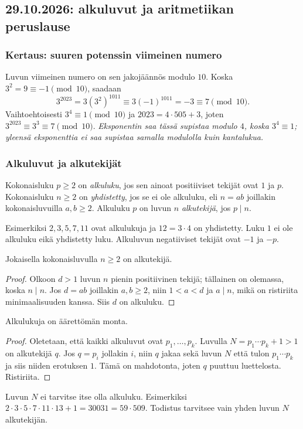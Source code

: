 \documentclass[11pt,a4paper]{amsart}
\begin{document}
\newpage
\subsection{29.10.2026: alkuluvut ja aritmetiikan peruslause}

\subsubsection{Kertaus: suuren potenssin viimeinen numero}
Luvun viimeinen numero on sen jakojäännös modulo $10$.
Koska $3^2=9\equiv-1\pmod{10}$, saadaan
\[
  3^{2023}=3(3^2)^{1011}
  \equiv3(-1)^{1011}=-3\equiv7\pmod{10}.
\]
Vaihtoehtoisesti $3^4\equiv1\pmod{10}$ ja $2023=4\cdot505+3$, joten
$3^{2023}\equiv3^3\equiv7\pmod{10}$.
\emph{Eksponentin saa tässä supistaa modulo $4$, koska $3^4\equiv1$;
yleensä eksponenttia ei saa supistaa samalla modulolla kuin kantalukua.}

\subsubsection{Alkuluvut ja alkutekijät}
\begin{definition}
  Kokonaisluku $p\ge2$ on \emph{alkuluku}, jos sen ainoat
  positiiviset tekijät ovat $1$ ja $p$. Kokonaisluku $n\ge2$ on
  \emph{yhdistetty}, jos se ei ole alkuluku, eli $n=ab$ joillakin
  kokonaisluvuilla $a,b\ge2$. Alkuluku $p$ on luvun $n$
  \emph{alkutekijä}, jos $p\mid n$.
\end{definition}
Esimerkiksi $2,3,5,7,11$ ovat alkulukuja ja $12=3\cdot4$ on
yhdistetty. Luku $1$ ei ole alkuluku eikä yhdistetty luku.
Alkuluvun negatiiviset tekijät ovat $-1$ ja $-p$.

\begin{lemma}
  Jokaisella kokonaisluvulla $n\ge2$ on alkutekijä.
\end{lemma}
\begin{proof}
  Olkoon $d>1$ luvun $n$ pienin positiivinen tekijä; tällainen on
  olemassa, koska $n\mid n$. Jos $d=ab$ joillakin $a,b\ge2$, niin
  $1<a<d$ ja $a\mid n$, mikä on ristiriita minimaalisuuden kanssa.
  Siis $d$ on alkuluku.
\end{proof}

\begin{theorem}
  Alkulukuja on äärettömän monta.
\end{theorem}
\begin{proof}
  Oletetaan, että kaikki alkuluvut ovat $p_1,\ldots,p_k$.
  Luvulla $N=p_1\cdots p_k+1>1$ on alkutekijä $q$.
  Jos $q=p_i$ jollakin $i$, niin $q$ jakaa sekä luvun $N$ että
  tulon $p_1\cdots p_k$ ja siis niiden erotuksen $1$. Tämä on
  mahdotonta, joten $q$ puuttuu luettelosta. Ristiriita.
\end{proof}
Luvun $N$ ei tarvitse itse olla alkuluku. Esimerkiksi
$2\cdot3\cdot5\cdot7\cdot11\cdot13+1=30031=59\cdot509$.
Todistus tarvitsee vain yhden luvun $N$ alkutekijän.
\end{document}
